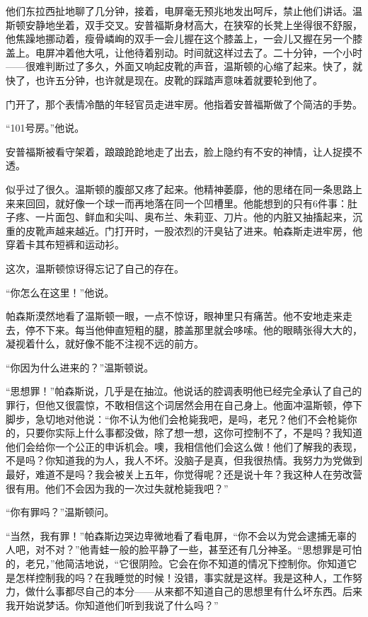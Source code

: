 他们东拉西扯地聊了几分钟，接着，电屏毫无预兆地发出呵斥，禁止他们讲话。温斯顿安静地坐着，双手交叉。安普福斯身材高大，在狭窄的长凳上坐得很不舒服，他焦躁地挪动着，瘦骨嶙峋的双手一会儿握在这个膝盖上，一会儿又握在另一个膝盖上。电屏冲着他大吼，让他待着别动。时间就这样过去了。二十分钟，一个小时——很难判断过了多久，外面又响起皮靴的声音，温斯顿的心缩了起来。快了，就快了，也许五分钟，也许就是现在。皮靴的踩踏声意味着就要轮到他了。

门开了，那个表情冷酷的年轻官员走进牢房。他指着安普福斯做了个简洁的手势。

``101号房。''他说。

安普福斯被看守架着，踉踉跄跄地走了出去，脸上隐约有不安的神情，让人捉摸不透。

似乎过了很久。温斯顿的腹部又疼了起来。他精神萎靡，他的思绪在同一条思路上来来回回，就好像一个球一而再地落在同一个凹槽里。他能想到的只有6件事：肚子疼、一片面包、鲜血和尖叫、奥布兰、朱莉亚、刀片。他的内脏又抽搐起来，沉重的皮靴声越来越近。门打开时，一股浓烈的汗臭钻了进来。帕森斯走进牢房，他穿着卡其布短裤和运动衫。

这次，温斯顿惊讶得忘记了自己的存在。

``你怎么在这里！''他说。

帕森斯漠然地看了温斯顿一眼，一点不惊讶，眼神里只有痛苦。他不安地走来走去，停不下来。每当他伸直短粗的腿，膝盖那里就会哆嗦。他的眼睛张得大大的，凝视着什么，就好像不能不注视不远的前方。

``你因为什么进来的？''温斯顿说。

``思想罪！''帕森斯说，几乎是在抽泣。他说话的腔调表明他已经完全承认了自己的罪行，但他又很震惊，不敢相信这个词居然会用在自己身上。他面冲温斯顿，停下脚步，急切地对他说：``你不认为他们会枪毙我吧，是吗，老兄？他们不会枪毙你的，只要你实际上什么事都没做，除了想一想，这你可控制不了，不是吗？我知道他们会给你一个公正的申诉机会。噢，我相信他们会这么做！他们了解我的表现，不是吗？你知道我的为人，我人不坏。没脑子是真，但我很热情。我努力为党做到最好，难道不是吗？我会被关上五年，你觉得呢？还是说十年？我这种人在劳改营很有用。他们不会因为我的一次过失就枪毙我吧？''

``你有罪吗？''温斯顿问。

``当然，我有罪！''帕森斯边哭边卑微地看了看电屏，``你不会以为党会逮捕无辜的人吧，对不对？''他青蛙一般的脸平静了一些，甚至还有几分神圣。``思想罪是可怕的，老兄，''他简洁地说，``它很阴险。它会在你不知道的情况下控制你。你知道它是怎样控制我的吗？在我睡觉的时候！没错，事实就是这样。我是这种人，工作努力，做什么事都尽自己的本分——从来都不知道自己的思想里有什么坏东西。后来我开始说梦话。你知道他们听到我说了什么吗？''

